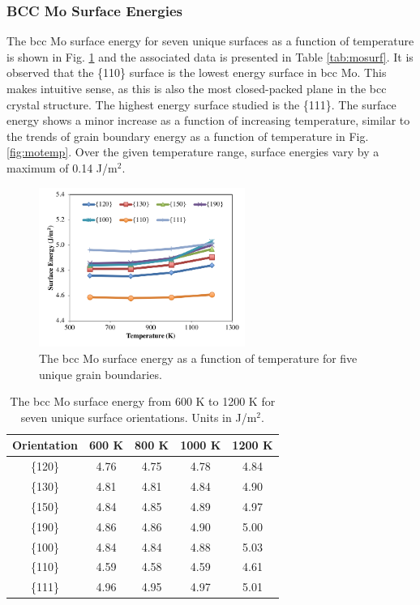 \documentclass[review]{elsarticle}
\begin{document}
\FloatBarrier

\subsubsection{BCC Mo Surface Energies}

The bcc Mo surface energy for seven unique surfaces as a function of temperature is shown in Fig. \ref{fig:mosurf} and the associated data is presented in Table \ref{tab:mosurf}. It is observed that the \{110\} surface is the lowest energy surface in bcc Mo. This makes intuitive sense, as this is also the most closed-packed plane in the bcc crystal structure. The highest energy surface studied is the \{111\}. The surface energy shows a minor increase as a function of increasing temperature, similar to the trends of grain boundary energy as a function of temperature in Fig. \ref{fig:motemp}. Over the given temperature range, surface energies vary by a maximum of 0.14 J/m$^{2}$.

\begin{figure}[h]
 \centering
 \includegraphics[width=0.6\textwidth]{mosurf.png}
 \caption{The bcc Mo surface energy as a function of temperature for five unique grain boundaries.}
 \label{fig:mosurf}
\end{figure}

\begin{table}[h]
\caption{The bcc Mo surface energy from 600 K to 1200 K for seven unique surface orientations. Units in J/m$^{2}$. } \label{tab:mosurf}
\begin{center}
\begin{tabular}{|c|c|c|c|c|}
	\hline
	Orientation & 600 K & 800 K & 1000 K & 1200 K \\
	 \hline
	 \{120\} & 4.76 & 4.75 & 4.78 & 4.84 \\
	 \{130\} & 4.81 & 4.81 & 4.84 & 4.90 \\
	 \{150\} & 4.84 & 4.85 & 4.89 & 4.97 \\
	 \{190\} & 4.86 & 4.86 & 4.90 & 5.00 \\
	 \{100\} & 4.84 & 4.84 & 4.88 & 5.03 \\
	 \{110\} & 4.59 & 4.58 & 4.59 & 4.61 \\
	 \{111\} & 4.96 & 4.95 & 4.97 & 5.01 \\	 
	 \hline
\end{tabular}
\end{center}
\label{default}
\end{table}
\end{document}
